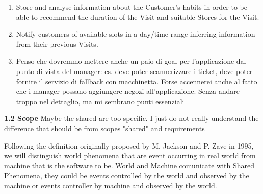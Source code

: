 \documentclass[a4paper, 10pt, oneside]{article}
\newcommand*{\lorenzo}[1]{\textcolor{BurntOrange}{#1}}
\begin{document}
\begin{enumerate}[label={G.\arabic{*}}]
\begin{enumerate}[label={\ref{goal:visit}.\arabic{*}}]
        \item Store and analyse information about the Customer's habits in order to be able to recommend the duration of the Visit and suitable Stores for the Visit.
        \item Notify customers of available slots in a day/time range inferring information from their previous Visits.
    \item \lorenzo{Penso che dovremmo mettere anche un paio di goal per l'applicazione dal punto di vista del manager: es. deve poter scannerizzare i ticket, deve poter fornire il servizio di fallback con macchinetta. Forse accennerei anche al fatto che i manager possano aggiungere negozi all'applicazione. Senza andare troppo nel dettaglio, ma mi sembrano punti essenziali}
    \end{enumerate}
\end{enumerate}

\pagebreak

{\large \textbf{1.2 Scope}}
\lorenzo{Maybe the shared are too specific. I just do not really understand the difference that should be from scopes "shared" and requirements}

\begin{flushleft}
Following the definition originally proposed by M. Jackson and P. Zave in 1995,
we will distinguish world phenomena that are event occurring in real world from machine
that is the software to be.
World and Machine comunicate with Shared Phenomena, they could be events controlled by the world and observed by the machine or events controller by machine and observed by the world.
\end{flushleft}
\end{document}
